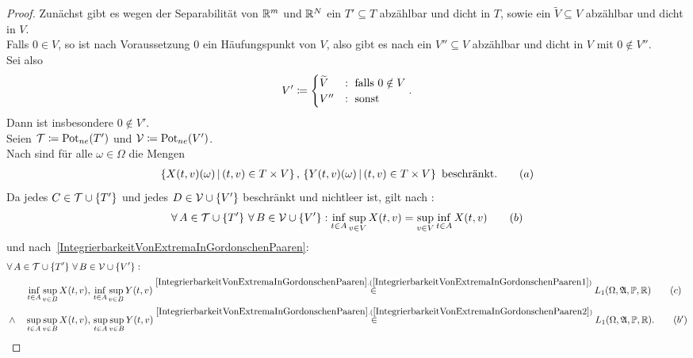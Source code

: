 \begin{proof}
Zunächst gibt es wegen der Separabilität von $\mathbb{R}^m$ und $\mathbb{R}^N$ ein
$T' \subseteq T$ abzählbar und dicht in $T$, sowie ein
$\widetilde V \subseteq V$ abzählbar und dicht in $V$.\\
Falls $0 \in V$, so ist nach Voraussetzung $0$ ein Häufungspunkt von $V$, also
gibt es nach 
 ein
$V'' \subseteq V$ abzählbar und dicht in $V$ mit $0 \notin V''$.\\
Sei also
\[V' \coloneqq  \begin{cases}\widetilde V &:\text{ falls } 0 \notin V\\
V'' & : \text{ sonst} \end{cases}\text.\]
Dann ist insbesondere $0 \notin V'$.\\
Seien $\mathcal{T} \coloneqq  \mathop{\textrm{Pot}}\nolimits_{ne}(T')$ und $\mathcal{V}\coloneqq  \mathop{\textrm{Pot}}\nolimits_{ne}(V')$.\\
Nach
sind für alle $\omega \in \Omega$ die Mengen
\begin{align}\left\{X(t, v)(\omega)\,|\,(t, v) \in T \times V\right\},\,
\left\{Y(t, v)(\omega)\,|\,(t, v) \in T \times V\right\} \text{ beschränkt.}\tag {$a$}
\end{align}
Da jedes $C \in \mathcal{T}\cup\left\{T'\right\}$ und jedes $D\in\mathcal{V}\cup\left\{V'\right\}$
beschränkt und nichtleer ist, gilt nach
:
\begin{align}
\forall\, A \in \mathcal{T}\cup\left\{T'\right\}\, \forall\, B \in \mathcal{V}\cup\left\{V'\right\}:
 \inf_{t \in A}\sup_{v \in V}X(t, v) = \sup_{v \in V}\inf_{t \in A}X(t,v)
 \tag {$b$}
\end{align}
und nach~\ref{IntegrierbarkeitVonExtremaInGordonschenPaaren}:
\begin{align*}
 &\forall\, A \in \mct\cup\meng{T'}\, \forall\, B \in \mcv\cup\meng{V'}:\\
 &\quad \quad
 \inf_{t \in A}\sup_{v \in B}X(t, v), \, \inf_{t \in A}\sup_{v \in B}Y(t, v)
 \overset{\refclaim{IntegrierbarkeitVonExtremaInGordonschenPaaren}
 {IntegrierbarkeitVonExtremaInGordonschenPaaren1}}\in L_1(\Omega,\mfa,\Prim,\R)
 \tag  {$c$}\\
 &\wedge\quad
 \sup_{t \in A}\sup_{v \in B}X(t, v), \, \sup_{t \in A}\sup_{v \in B}Y(t, v)
 \overset{\refclaim{IntegrierbarkeitVonExtremaInGordonschenPaaren}
 {IntegrierbarkeitVonExtremaInGordonschenPaaren2}}\in L_1(\Omega,\mfa,\Prim,\R)
  \text.\tag {$b'$}
\end{align*}

\end{proof}

